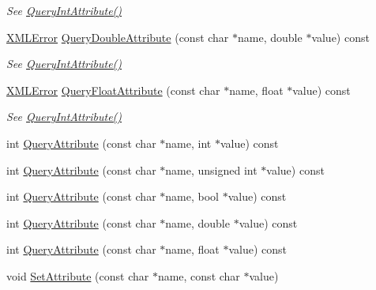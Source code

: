 \begin{DoxyCompactItemize}
\begin{DoxyCompactList}\small\item\em See \hyperlink{classtinyxml2_1_1_x_m_l_element_a8b92c729346aa8ea9acd59ed3e9f2378}{Query\+Int\+Attribute()} \end{DoxyCompactList}\item 
\hyperlink{namespacetinyxml2_a1fbf88509c3ac88c09117b1947414e08}{X\+M\+L\+Error} \hyperlink{classtinyxml2_1_1_x_m_l_element_a1ffeed461d3e4020b39652cd6d3cd773}{Query\+Double\+Attribute} (const char $\ast$name, double $\ast$value) const 
\begin{DoxyCompactList}\small\item\em See \hyperlink{classtinyxml2_1_1_x_m_l_element_a8b92c729346aa8ea9acd59ed3e9f2378}{Query\+Int\+Attribute()} \end{DoxyCompactList}\item 
\hyperlink{namespacetinyxml2_a1fbf88509c3ac88c09117b1947414e08}{X\+M\+L\+Error} \hyperlink{classtinyxml2_1_1_x_m_l_element_a3f154e0b4b6903249ff9f758921758e5}{Query\+Float\+Attribute} (const char $\ast$name, float $\ast$value) const 
\begin{DoxyCompactList}\small\item\em See \hyperlink{classtinyxml2_1_1_x_m_l_element_a8b92c729346aa8ea9acd59ed3e9f2378}{Query\+Int\+Attribute()} \end{DoxyCompactList}\item 
int \hyperlink{classtinyxml2_1_1_x_m_l_element_aa471a199af9f137ef371f5db1ed1016b}{Query\+Attribute} (const char $\ast$name, int $\ast$value) const 
\item 
int \hyperlink{classtinyxml2_1_1_x_m_l_element_a60d18656aa70adb257eab18913aa4330}{Query\+Attribute} (const char $\ast$name, unsigned int $\ast$value) const 
\item 
int \hyperlink{classtinyxml2_1_1_x_m_l_element_a23fa8bac4250249c476c6bfdb6cb9b9c}{Query\+Attribute} (const char $\ast$name, bool $\ast$value) const 
\item 
int \hyperlink{classtinyxml2_1_1_x_m_l_element_a64aadcbf27423410e2896baf240f63f9}{Query\+Attribute} (const char $\ast$name, double $\ast$value) const 
\item 
int \hyperlink{classtinyxml2_1_1_x_m_l_element_afd553774be0e7760d73003058efa8df9}{Query\+Attribute} (const char $\ast$name, float $\ast$value) const 
\item 
void \hyperlink{classtinyxml2_1_1_x_m_l_element_a11943abf2d0831548c3790dd5d9f119c}{Set\+Attribute} (const char $\ast$name, const char $\ast$value)

\end{DoxyCompactItemize}
